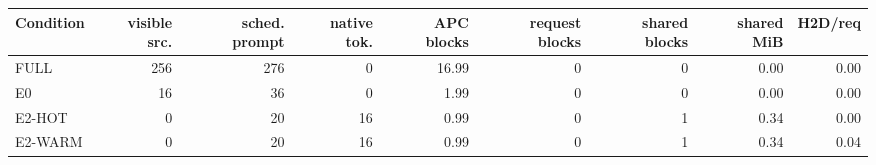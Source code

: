 \begin{tabular}{lrrrrrrrr}
\toprule
Condition & visible src. & sched. prompt & native tok. & APC blocks & request blocks & shared blocks & shared MiB & H2D/req \\
\midrule
FULL & 256 & 276 & 0 & 16.99 & 0 & 0 & 0.00 & 0.00 \\
E0 & 16 & 36 & 0 & 1.99 & 0 & 0 & 0.00 & 0.00 \\
E2-HOT & 0 & 20 & 16 & 0.99 & 0 & 1 & 0.34 & 0.00 \\
E2-WARM & 0 & 20 & 16 & 0.99 & 0 & 1 & 0.34 & 0.04 \\
\bottomrule
\end{tabular}
